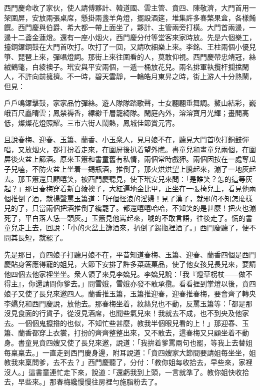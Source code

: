 西門慶命收了家伙，使人請傅夥計、韓道國、雲主管、賁四、陳敬濟，大門首用一架圍屏，安放兩張桌席，懸掛兩盞羊角燈，擺設酒筵，堆集許多春檠果盒，各樣餚饌。西門慶與伯爵、希大都一帶上面坐了，夥計、主管兩旁打橫。大門首兩邊，一邊十二盞金蓮燈。還有一座小烟火，西門慶分付等堂客來家時放。先是六個樂工，擡銅鑼銅鼓在大門首吹打。吹打了一回，又請吹細樂上來。李銘、王柱兩個小優兒箏、琵琶上來，彈唱燈詞。那街上來往圍看的人，莫敢仰視。西門慶帶忠靖冠，絲絨鶴氅，白綾襖子。玳安與平安兩個，一遞一桶放花兒。兩名排軍執攬杆攔擋閑人，不許向前擁擠。不一時，碧天雲靜，一輪皓月東昇之時，街上游人十分熱鬧，但見：

\begin{myquote}
戶戶鳴鑼擊鼓，家家品竹彈絲。遊人隊隊踏歌聲，士女翩翩垂舞調。鰲山結彩，巍峨百尺矗晴雲；鳳禁褥香，縹緲千層籠綺隊。閑庭內外，溶溶寶月光輝；畫閣高低，燦燦花燈照耀。三市六街人鬧熱，鳳城佳節賞元宵。
\end{myquote}

且說春梅、迎春、玉簫、蘭香、小玉衆人，見月娘不在，聽見大門首吹打銅鼓彈唱，又放烟火，都打扮着走來，在圍屏後扒着望外瞧。書童兒和畫童兒兩個，在圍屏後火盆上篩酒。原來玉簫和書童舊有私情，兩個常時戲狎。兩個因按在一處奪瓜子兒嗑，不防火盆上坐着一錫瓶酒，推倒了，那火烘烘望上騰起來，漰了一地灰起去。那玉簫還只顧嘻笑，被西門慶聽見，使下玳安兒來問：「是誰笑？怎的這等灰起？」那日春梅穿着新白綾襖子，大紅遍地金比甲，正坐在一張椅兒上，看見他兩個推倒了酒，就揚聲罵玉簫道：「好個怪浪的淫婦！見了漢子，就邪的不知怎麼樣兒的了，只當兩個把酒推倒了纔罷了。都還嘻嘻哈哈，不知笑的是甚麼！把火也漰死了，平白落人恁一頭灰。」玉簫見他罵起來，唬的不敢言語，往後走了。慌的書童兒走上去，回說：「小的火盆上篩酒來，扒倒了錫瓶裡酒了。」西門慶聽了，便不問其長短，就罷了。

先是那日，賁四娘子打聽月娘不在，平昔知道春梅、玉簫、迎春、蘭香四個是西門慶貼身答應得寵的姐兒，大節下安排了許多菜蔬菓品，使了他女孩兒長兒來，要請他四個去他家裡坐坐。衆人領了來見李嬌兒。李嬌兒說：「我『燈草柺杖——做不得主』，你還請問你爹去。」問雪娥，雪娥亦發不敢承攬。看看捱到掌燈以後，賁四娘子又使了長兒來邀四人。蘭香推玉簫，玉簫推迎春，迎春推春梅，要會齊了轉央李嬌兒和西門慶說，放他去。那春梅坐着，紋絲兒也不動，反罵玉簫等：「都是那沒見食面的行貨子，從沒見酒席，也聞些氣兒來！我就去不成，也不到央及他家去。一個個鬼攛揝的也似，不知忙些甚麼，教我半個眼兒看的上！」那迎春、玉簫、蘭香都穿上衣裳，打扮的齊齊整整出來，又不敢去，這春梅又只顧坐着不動身。書童見賁四嫂又使了長兒來邀，說道：「我拚着爹罵兩句也罷，等我上去替姐每稟稟去。」一直走到西門慶身邊，附耳說道：「賁四嫂家大節間要請姐每坐坐，姐教我來稟問爹，去不去？」西門慶聽了，分付：「教你姐每收拾去，早些來，家裡沒人。」這書童連忙走下來，說道：「還虧我到上頭，一言就準了。教你姐快收拾去，早些來。」那春梅纔慢慢往房裡勻施脂粉去了。

